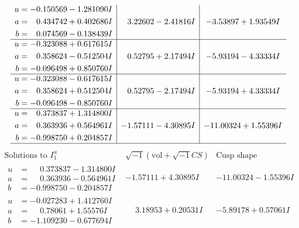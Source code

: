 \documentclass[1p]{elsarticle_modified}
\theoremstyle{definition}
\newcommand{\I}{\sqrt{-1}}
\begin{document}
$$\begin{array}{c|c|c}
\begin{aligned}
u &= -0.150569 - 1.281090 I \\
a &= \phantom{-}0.434742 + 0.402686 I \\
b &= \phantom{-}0.074569 - 0.138439 I\end{aligned}
 & \phantom{-}3.22602 - 2.41816 I & -3.53897 + 1.93549 I \\ \hline\begin{aligned}
u &= -0.323088 + 0.617615 I \\
a &= \phantom{-}0.358624 - 0.512504 I \\
b &= -0.096498 + 0.850760 I\end{aligned}
 & \phantom{-}0.52795 + 2.17494 I & -5.93194 - 4.33334 I \\ \hline\begin{aligned}
u &= -0.323088 - 0.617615 I \\
a &= \phantom{-}0.358624 + 0.512504 I \\
b &= -0.096498 - 0.850760 I\end{aligned}
 & \phantom{-}0.52795 - 2.17494 I & -5.93194 + 4.33334 I \\ \hline\begin{aligned}
u &= \phantom{-}0.373837 + 1.314800 I \\
a &= \phantom{-}0.363936 + 0.564961 I \\
b &= -0.998750 + 0.204857 I\end{aligned}
 & -1.57111 - 4.30895 I & -11.00324 + 1.55396 I\\
 \hline 
 \end{array}$$\newpage$$\begin{array}{c|c|c}  
\text{Solutions to }I^u_{1}& \I (\text{vol} + \sqrt{-1}CS) & \text{Cusp shape}\\
 \hline 
\begin{aligned}
u &= \phantom{-}0.373837 - 1.314800 I \\
a &= \phantom{-}0.363936 - 0.564961 I \\
b &= -0.998750 - 0.204857 I\end{aligned}
 & -1.57111 + 4.30895 I & -11.00324 - 1.55396 I \\ \hline\begin{aligned}
u &= -0.027283 + 1.412760 I \\
a &= \phantom{-}0.78061 + 1.55576 I \\
b &= -1.109230 - 0.677694 I\end{aligned}
 & \phantom{-}3.18953 + 0.20531 I & -5.89178 + 0.57061 I \\ \hline\begin{aligned}

\end{aligned}
\end{array}$$
\end{document}
